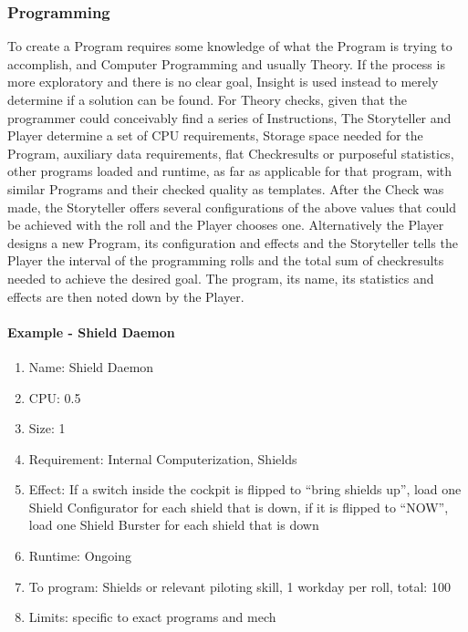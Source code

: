 \subsubsection{Programming}
To create a Program requires some knowledge of what the Program is trying to accomplish, and Computer Programming and
usually Theory.
If the process is more exploratory and there is no clear goal, Insight is used instead to merely
determine if a solution can be found.
For Theory checks, given that the programmer could conceivably find a series of Instructions, The Storyteller and
Player determine a set of CPU requirements, Storage space needed for the Program, auxiliary data requirements, flat
Checkresults or purposeful statistics, other programs loaded and runtime, as far as applicable for that program, with
similar Programs and their checked quality as templates.
After the Check was made, the Storyteller offers several configurations of the above values that could be achieved with
the roll and the Player chooses one.
Alternatively the Player designs a new Program, its configuration and effects and the Storyteller tells the Player the
interval of the programming rolls and the total sum of checkresults needed to achieve the desired goal.
The program, its name, its statistics and effects are then noted down by the Player.

\paragraph{Example - Shield Daemon}
\begin{enumerate}
    \item Name: Shield Daemon
    \item CPU: 0.5
    \item Size: 1
    \item Requirement: Internal Computerization, Shields
    \item Effect: If a switch inside the cockpit is flipped to ``bring shields up'',
    load one Shield Configurator for each shield that is down,
    if it is flipped to ``NOW'', load one Shield Burster for each shield that is down
    \item Runtime: Ongoing
    \item To program: Shields or relevant piloting skill, 1 workday per roll, total: 100
    \item Limits: specific to exact programs and mech
\end{enumerate}

